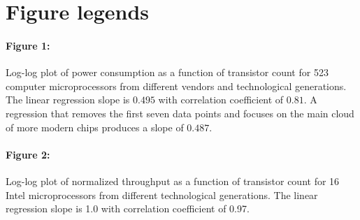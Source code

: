 \documentclass[12pt]{article}
\begin{document}



\newpage

\section*{Figure legends}
\paragraph{Figure 1:} Log-log plot of power consumption as a function 
of transistor count for 523 computer microprocessors from different 
vendors and technological generations.  The linear regression slope is 
$0.495$ with correlation coefficient of $0.81$. A regression that 
removes the first seven data points and focuses on the main cloud of 
more modern chips produces a slope of $0.487$.

\paragraph{Figure 2:} Log-log plot of normalized throughput as a 
function of transistor count for 16 Intel microprocessors from 
different technological generations.  The linear regression slope is 
1.0 with correlation coefficient of 0.97.
\end{document}
